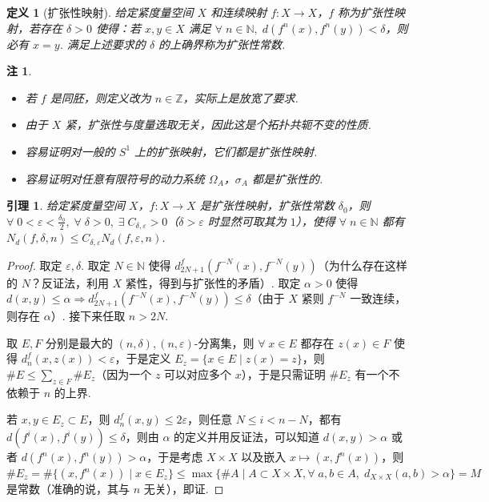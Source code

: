 \documentclass[11pt, a4paper, oneside]{ctexart}
\newtheorem{definition}[theorem]{定义}
\newtheorem{lemma}[theorem]{引理}
\newtheorem{remark}[theorem]{注}
\newcommand{\N}{\mathbb{N}}
\newcommand{\Z}{\mathbb{Z}}
\begin{document}
    \begin{definition}[扩张性映射]
        给定紧度量空间 $X$ 和连续映射 $f:X\to X$，$f$ 称为扩张性映射，若存在 $\delta>0$ 使得：若 $x,y\in X$ 满足 $\forall\;n\in\N,\; d(f^n(x),f^n(y))<\delta$，则必有 $x=y$. 满足上述要求的 $\delta$ 的上确界称为扩张性常数.
    \end{definition}
    \begin{remark}
        \begin{itemize}
            \item 若 $f$ 是同胚，则定义改为 $n\in\Z$，实际上是放宽了要求.
            \item 由于 $X$ 紧，扩张性与度量选取无关，因此这是个拓扑共轭不变的性质.
            \item 容易证明对一般的 $S^1$ 上的扩张映射，它们都是扩张性映射.
            \item 容易证明对任意有限符号的动力系统 $\Omega_A$，$\sigma_A$ 都是扩张性的.
        \end{itemize}
    \end{remark}
    \begin{lemma}
        给定紧度量空间 $X$，$f:X\to X$ 是扩张性映射，扩张性常数 $\delta_0$，则 $\forall\; 0<\varepsilon<\frac{\delta_0}{2},\;\forall\;\delta>0,\;\exists\; C_{\delta,\varepsilon}>0$（$\delta>\varepsilon$ 时显然可取其为 $1$），使得 $\forall\; n\in\N$ 都有 $N_d(f,\delta,n)\leq C_{\delta,\varepsilon}N_d(f,\varepsilon,n)$.
    \end{lemma}
    \begin{proof}
        取定 $\varepsilon,\delta$. 取定 $N\in\N$ 使得 $d_{2N+1}^f(f^{-N}(x),f^{-N}(y))$（为什么存在这样的 $N$？反证法，利用 $X$ 紧性，得到与扩张性的矛盾）. 取定 $\alpha>0$ 使得 $d(x,y)\leq \alpha\Rightarrow d_{2N+1}^f(f^{-N}(x),f^{-N}(y))\leq \delta$（由于 $X$ 紧则 $f^{-N}$ 一致连续，则存在 $\alpha$）. 接下来任取 $n>2N$.

        取 $E,F$ 分别是最大的 $(n,\delta),(n,\varepsilon)$-分离集，则 $\forall\; x\in E$ 都存在 $z(x)\in F$ 使得 $d_n^f(x,z(x))<\varepsilon$，于是定义 $E_z=\{x\in E\mid z(x)=z\}$，则 $\# E\leq \sum\limits_{z\in F}\# E_z$（因为一个 $z$ 可以对应多个 $x$），于是只需证明 $\# E_z$ 有一个不依赖于 $n$ 的上界.

        若 $x,y\in E_z\subset E$，则 $d_n^f(x,y)\leq 2\varepsilon$，则任意 $N\leq i<n-N$，都有 $d(f^i(x),f^i(y))\leq \delta$，则由 $\alpha$ 的定义并用反证法，可以知道 $d(x,y)>\alpha$ 或者 $d(f^n(x),f^n(y))>\alpha$，于是考虑 $X\times X$ 以及嵌入 $x\mapsto (x,f^n(x))$，则 $\# E_z=\# \{(x,f^n(x))\mid x\in E_z\}\leq \max\{\# A\mid A\subset X\times X,\forall\; a,b\in A,\; d_{X\times X}(a,b)>\alpha\}=M$ 是常数（准确的说，其与 $n$ 无关），即证.
    \end{proof}
\end{document}
